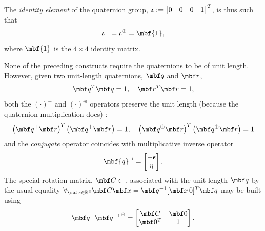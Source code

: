 \documentclass[11pt,a4paper,oneside]{article}
\newcommand{\SOThree}{\text{SO(3) }}
\begin{document}
The {\em identity element} of the quaternion group,
${\boldsymbol{\iota}} := \begin{bmatrix} 0 & 0 & 0 & 1 \end{bmatrix}^T$, is thus such that
\begin{equation}
\qc{\mbs{\iota}} = \qo{\mbs{\iota}} = \mbf{1},
\end{equation}
where $\mbf{1}$ is the $4 \times 4$ identity matrix. 

None of the preceding constructs require the quaternions to be of unit length.
However, given two unit-length quaternions, $\mbf q$ and $\mbf r$, 
\begin{equation}
  \label{eq:unit-len}
  \mbf q^T \mbf q = 1, \quad \mbf r^T \mbf r = 1,
\end{equation}
both the $(\cdot)^+$ and $(\cdot)^\oplus$ operators preserve the unit length (because the quaternion multiplication does) :
\begin{equation}	
  \label{eq:unit-length}
  \left(\qc{\mbf q}\mbf r \right)^T\left(\qc{\mbf q}\mbf r\right) = 1, \quad   \left(\qo{\mbf q}\mbf r \right)^T\left(\qo{\mbf q}\mbf r\right) = 1
\end{equation}
and the {\em conjugate} operator coincides with multiplicative inverse operator
\begin{equation}
\qi{\mbf{q}} = \bbm -\mbs{\ep} \\ \eta \ebm.
\end{equation}
The special rotation matrix, $\mbf C\in $ \SOThree, associated with the unit length $\mbf q$ by the usual equality $\forall_{\mbf x\in \R^3}\mbf C \mbf x = \mbf q^{-1} [\mbf x\, 0]^T \mbf q$ may be built using
\begin{equation}
  \label{eq:qtor}
  \mbf q ^{+} {\mbf q^{-1}}^{\oplus} = \bbm \mbf C & \mbf 0 \\ \mbf 0^T & 1 \ebm.
\end{equation}
\end{document}

